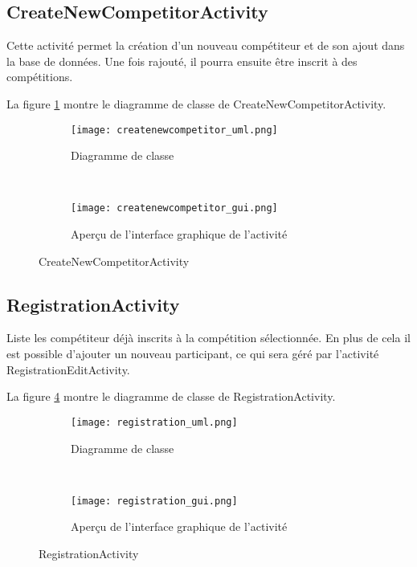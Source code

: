 \subsection{CreateNewCompetitorActivity}

Cette activité permet la création d'un nouveau compétiteur et de son ajout dans la base de données. Une fois rajouté, il pourra ensuite être inscrit à des compétitions.

La figure \ref{fig:createnewcompetitor_uml} montre le diagramme de classe de CreateNewCompetitorActivity.

\begin{figure}[htb!]
    \centering
    \begin{subfigure}[htb]{0.49\textwidth}
		\texttt{[image: createnewcompetitor\_uml.png]} 
		\caption{Diagramme de classe}
		\label{fig:createnewcompetitor_uml}
    \end{subfigure}
    ~ %
    \begin{subfigure}[htb]{0.49\textwidth}
		\texttt{[image: createnewcompetitor\_gui.png]} 
		\caption{Aperçu de l'interface graphique de l'activité}
		\label{fig:createnewcompetitor_gui}
    \end{subfigure}
    \caption{CreateNewCompetitorActivity}\label{fig:createnewcompetitor_fig}
\end{figure}

\subsection{RegistrationActivity}

Liste les compétiteur déjà inscrits à la compétition sélectionnée. En plus de cela il est possible d'ajouter un nouveau participant, ce qui sera géré par l'activité RegistrationEditActivity.

La figure \ref{fig:registration_uml} montre le diagramme de classe de RegistrationActivity.

\begin{figure}[htb!]
    \centering
    \begin{subfigure}[htb]{0.49\textwidth}
		\texttt{[image: registration\_uml.png]} 
		\caption{Diagramme de classe}
		\label{fig:registration_uml}
    \end{subfigure}
    ~ %
    \begin{subfigure}[htb]{0.49\textwidth}
		\texttt{[image: registration\_gui.png]} 
		\caption{Aperçu de l'interface graphique de l'activité}
		\label{fig:registration_gui}
    \end{subfigure}
    \caption{RegistrationActivity}\label{fig:registration_fig}
\end{figure}


